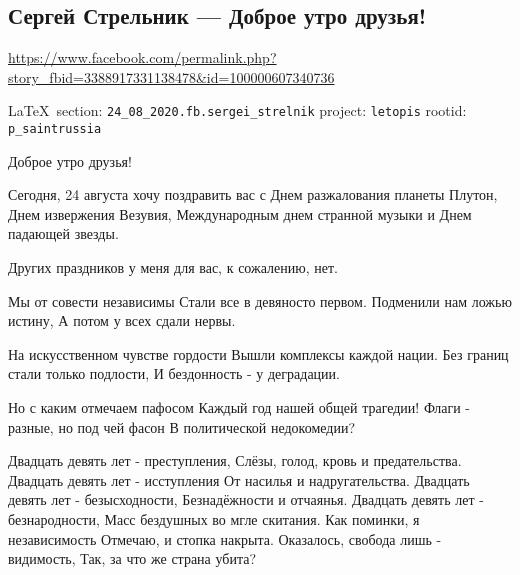  
 
\subsection{Сергей Стрельник --- Доброе утро друзья!}
\url{https://www.facebook.com/permalink.php?story_fbid=3388917331138478&id=100000607340736}
  
\vspace{0.5cm}
 {\ifDEBUG\small\LaTeX~section: \verb|24_08_2020.fb.sergei_strelnik| project: \verb|letopis| rootid: \verb|p_saintrussia| \fi}
\vspace{0.5cm}
  
Доброе утро друзья!

Сегодня, 24 августа хочу поздравить вас с Днем разжалования планеты Плутон, Днем извержения Везувия, Международным днем странной музыки и Днем падающей звезды.

Других праздников у меня для вас, к сожалению, нет.

\begin{multicols}{2}
	\obeycr
Мы от совести независимы
Стали все в девяносто первом.
Подменили нам ложью истину,
А потом у всех сдали нервы.

На искусственном чувстве гордости
Вышли комплексы каждой нации.
Без границ стали только подлости,
И бездонность - у деградации.

Но с каким отмечаем пафосом
Каждый год нашей общей трагедии!
Флаги - разные, но под чей фасон
В политической недокомедии?

Двадцать девять лет - преступления,
Слёзы, голод, кровь и предательства.
Двадцать девять лет - исступления
От насилья и надругательства.
Двадцать девять лет - безысходности,
Безнадёжности и отчаянья.
Двадцать девять лет - безнародности,
Масс бездушных во мгле скитания.
Как поминки, я независимость
Отмечаю, и стопка накрыта.
Оказалось, свобода лишь - видимость,
Так, за что же страна убита?  
	\restorecr
\end{multicols}


